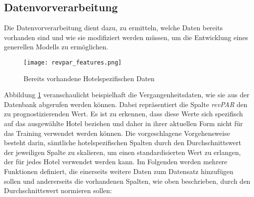 \subsection{Datenvorverarbeitung}
\label{subsec:revpar_prepare}
Die Datenvorverarbeitung dient dazu, zu ermitteln, welche Daten bereits vorhanden sind und wie sie modifiziert werden müssen, um die Entwicklung eines generellen Modells zu ermöglichen.

\begin{figure}[h]
    \centering
    \texttt{[image: revpar\_features.png]}
    \caption[Bereits vorhandene Hotelspezifischen Daten]{Bereits vorhandene Hotelspezifischen Daten}
    \label{img:revpar_features}
\end{figure}

Abbildung \ref{img:revpar_features} veranschaulicht beispielhaft die Vergangenheitsdaten, wie sie aus der Datenbank abgerufen werden können. Dabei repräsentiert die Spalte \emph{revPAR} den zu prognostizierenden Wert. Es ist zu erkennen, dass diese Werte sich spezifisch auf das ausgewählte Hotel beziehen und daher in ihrer aktuellen Form nicht für das Training verwendet werden können. Die vorgeschlagene Vorgehensweise besteht darin, sämtliche hotelspezifischen Spalten durch den Durchschnittswert der jeweiligen Spalte zu skalieren, um einen standardisierten Wert zu erlangen, der für jedes Hotel verwendet werden kann.
\newline 
\newline
Im Folgenden werden mehrere Funktionen definiert, die einerseits weitere Daten zum Datensatz hinzufügen sollen und andererseits die vorhandenen Spalten, wie oben beschrieben, durch den Durchschnittswert normieren sollen:

